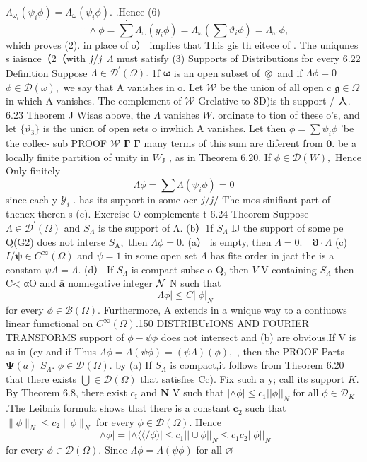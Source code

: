 $\Lambda_{\omega_{i}}(\psi_{i}\phi)=\Lambda_{\omega}(\psi_{i}\phi).$ .Hence (6) $$ \ ^{\cdot\cdot}\wedge\phi=\sum^{\cdot}\Lambda_{\omega}(y_{i}\phi)=\Lambda_{\omega}(\sum\vartheta_{i}\phi)=\Lambda_{\omega}\,\phi, $$ which proves (2). in place of o） implies that This gis th eitece of . The uniqunes s iaisnce（2（with ${\it j}/j$ $\Lambda$ must satisfy (3) Supports of Distributions for every 6.22 Definition Suppose $\Lambda\in{\mathcal{D}}^{\prime}(\Omega).$ 1f ${\boldsymbol{\omega}}$ is an open subset of $\underline{{\otimes}}$ and if $\Lambda\phi=0$ $\phi\in{\mathcal{D}}(\omega),$ we say that A vanishes in o. Let $\mathcal{W}$ be the union of all open c $\mathfrak{g}\in\Omega$ in which A vanishes. The complement of ${\mathcal{W}}$ Grelative to SD)is th support / 人. 6.23 Theorem J Wisas above, the $\Lambda$ vanishes $W.$ ordinate to tion of these o's, and let $\scriptstyle\{\vartheta_{3}\}$ is the union of open sets o inwhich A vanishes. Let then $\phi=\sum\psi_{i}\phi$ 'be the collec- sub PROOF $\mathcal{W}$ ${\boldsymbol{\Gamma}}$ ${\boldsymbol{\Gamma}}$ many terms of this sum are diferent from ${\boldsymbol{0}}.$ be a locally finite partition of unity in $W_{\mathrm{{J}}}$ , as in Theorem 6.20. If $\phi\in{\mathcal{D}}(W),$ Hence Only finitely $$ \Lambda\phi=\sum\Lambda(\psi_{i}\phi)=0 $$ since each y ${\mathcal{Y}}_{i}$ . has its support in some oer ${\it j}/{\it j}/$ The mos sinifiant part of thenex theren s (c). Exercise O complements t 6.24 Theorem Suppose $\Lambda\in{\mathcal{D}}^{\prime}(\Omega)$ and $S_{\Lambda}$ is the support of Λ. (b）1f $S_{\Lambda}$ IJ the support of some pe Q(G2) does not interse $S_{\mathrm{A}},$ then $\Lambda\phi=0.$ (a） is empty, then $\Lambda=0.\quad\mathbf{\partial}\cdot\Lambda$ (c) $I/{\boldsymbol{\psi}}\in C^{\infty}(\Omega)$ and $\psi=1$ in some open set $\Lambda$ has fite order in jact the is a constam $\psi\Lambda=\Lambda.$ (d） If $S_{\Lambda}$ is compact subse o Q, then ${\mathbf{}}V$ V containing $S_{\Lambda}$ then C< αO and $\bar{\boldsymbol{a}}$ nonnegative integer ${\cal N}$ N such that $$ \left|\Lambda\phi\right|\leq C\left| |\phi\right|_{N} $$ for every $\phi\in{\mathcal{B}}(\Omega).$ Furthermore, A extends in a wnique way to a contiuows linear fumctional on $C^{\infty}(\Omega).$150 DISTRIBUrIONS AND FOURIER TRANSFORMS support of $\phi-\psi\phi$ does not intersect and (b) are obvious.If V is as in (cy and if Thus $\Lambda\phi=\Lambda(\psi\phi)=(\psi\Lambda)(\phi),$ , then the PROOF Parts $\mathbf{\Psi}(a)$ $S_{\Lambda}.$ $\phi\in{\mathcal{D}}(\Omega).$ by (a) If $S_{\Lambda}$ is compact,it follows from Theorem 6.20 that there exists $\textstyle\bigcup\in{\mathcal{D}}(\Omega)$ that satisfies Cc). Fix such a y; call its support $K.$ By Theorem 6.8, there exist $c_{\mathrm{I}}$ and ${\boldsymbol{N}}$ V such that $|\wedge\phi|\leq c_{1}||\phi||_{N}$ for all $\phi\in{\mathcal{D}}_{K}$ .The Leibniz formula shows that there is a constant ${\boldsymbol{c}}_{2}$ such that $\|\phi\|_{N}\leq c_{2}\|\phi\|_{N}$ for every $\phi\in{\mathcal{D}}(\Omega).$ Hence $$ |\wedge\!\phi|=|\wedge\!\langle\!\langle\!\slash\phi)|\leq c_{1}|\!|\cup\!\phi||_{N}\leq c_{1}c_{2}|\!|\phi||_{N} $$ for every $\phi\in{\mathcal{D}}(\Omega).$ Since $\Lambda\phi=\Lambda(\psi\phi)$ for all $\varnothing\;$ 